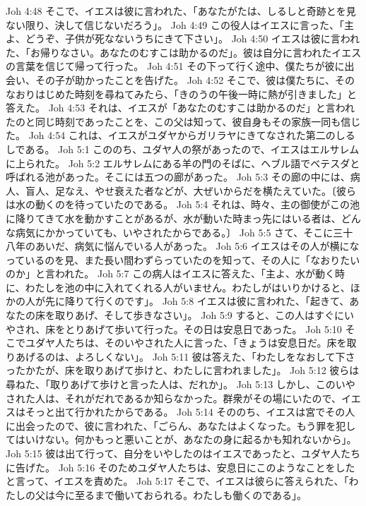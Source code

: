 Joh 4:48  そこで、イエスは彼に言われた、「あなたがたは、しるしと奇跡とを見ない限り、決して信じないだろう」。
Joh 4:49  この役人はイエスに言った、「主よ、どうぞ、子供が死なないうちにきて下さい」。
Joh 4:50  イエスは彼に言われた、「お帰りなさい。あなたのむすこは助かるのだ」。彼は自分に言われたイエスの言葉を信じて帰って行った。
Joh 4:51  その下って行く途中、僕たちが彼に出会い、その子が助かったことを告げた。
Joh 4:52  そこで、彼は僕たちに、そのなおりはじめた時刻を尋ねてみたら、「きのうの午後一時に熱が引きました」と答えた。
Joh 4:53  それは、イエスが「あなたのむすこは助かるのだ」と言われたのと同じ時刻であったことを、この父は知って、彼自身もその家族一同も信じた。
Joh 4:54  これは、イエスがユダヤからガリラヤにきてなされた第二のしるしである。
Joh 5:1  こののち、ユダヤ人の祭があったので、イエスはエルサレムに上られた。
Joh 5:2  エルサレムにある羊の門のそばに、ヘブル語でベテスダと呼ばれる池があった。そこには五つの廊があった。
Joh 5:3  その廊の中には、病人、盲人、足なえ、やせ衰えた者などが、大ぜいからだを横たえていた。〔彼らは水の動くのを待っていたのである。
Joh 5:4  それは、時々、主の御使がこの池に降りてきて水を動かすことがあるが、水が動いた時まっ先にはいる者は、どんな病気にかかっていても、いやされたからである。〕
Joh 5:5  さて、そこに三十八年のあいだ、病気に悩んでいる人があった。
Joh 5:6  イエスはその人が横になっているのを見、また長い間わずらっていたのを知って、その人に「なおりたいのか」と言われた。
Joh 5:7  この病人はイエスに答えた、「主よ、水が動く時に、わたしを池の中に入れてくれる人がいません。わたしがはいりかけると、ほかの人が先に降りて行くのです」。
Joh 5:8  イエスは彼に言われた、「起きて、あなたの床を取りあげ、そして歩きなさい」。
Joh 5:9  すると、この人はすぐにいやされ、床をとりあげて歩いて行った。その日は安息日であった。
Joh 5:10  そこでユダヤ人たちは、そのいやされた人に言った、「きょうは安息日だ。床を取りあげるのは、よろしくない」。
Joh 5:11  彼は答えた、「わたしをなおして下さったかたが、床を取りあげて歩けと、わたしに言われました」。
Joh 5:12  彼らは尋ねた、「取りあげて歩けと言った人は、だれか」。
Joh 5:13  しかし、このいやされた人は、それがだれであるか知らなかった。群衆がその場にいたので、イエスはそっと出て行かれたからである。
Joh 5:14  そののち、イエスは宮でその人に出会ったので、彼に言われた、「ごらん、あなたはよくなった。もう罪を犯してはいけない。何かもっと悪いことが、あなたの身に起るかも知れないから」。
Joh 5:15  彼は出て行って、自分をいやしたのはイエスであったと、ユダヤ人たちに告げた。
Joh 5:16  そのためユダヤ人たちは、安息日にこのようなことをしたと言って、イエスを責めた。
Joh 5:17  そこで、イエスは彼らに答えられた、「わたしの父は今に至るまで働いておられる。わたしも働くのである」。

